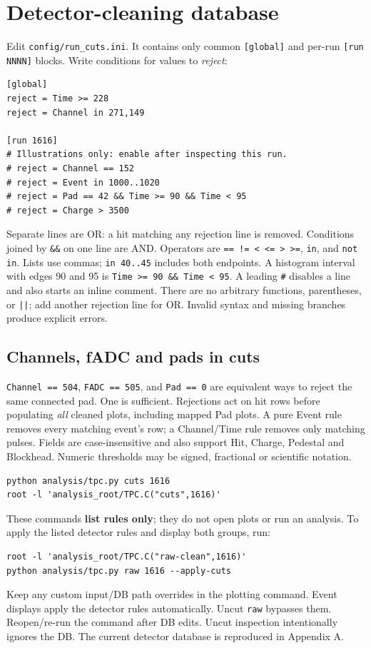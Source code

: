 \documentclass[11pt,a4paper]{article}
\begin{document}
\section{Detector-cleaning database}
Edit \texttt{config/run\_cuts.ini}. It contains only common \texttt{[global]} and
per-run \texttt{[run NNNN]} blocks. Write conditions for values to \emph{reject}:
\begin{lstlisting}
[global]
reject = Time >= 228
reject = Channel in 271,149

[run 1616]
# Illustrations only: enable after inspecting this run.
# reject = Channel == 152
# reject = Event in 1000..1020
# reject = Pad == 42 && Time >= 90 && Time < 95
# reject = Charge > 3500
\end{lstlisting}
Separate lines are OR: a hit matching any rejection line is removed. Conditions
joined by \texttt{\&\&} on one line are AND. Operators are
\texttt{== != < <= > >=}, \texttt{in}, and \texttt{not in}.
Lists use commas; \texttt{in 40..45} includes both endpoints. A histogram interval
with edges 90 and 95 is \texttt{Time >= 90 \&\& Time < 95}.
A leading \texttt{\#} disables a line and also starts an inline comment.
There are no arbitrary functions, parentheses, or \texttt{||}; add another rejection
line for OR. Invalid syntax and missing branches produce explicit errors.

\subsection{Channels, fADC and pads in cuts}
\texttt{Channel == 504}, \texttt{FADC == 505}, and \texttt{Pad == 0} are equivalent
ways to reject the same connected pad. One is sufficient. Rejections act on hit rows
before populating \emph{all} cleaned plots, including mapped Pad plots. A pure Event
rule removes every matching event's row; a Channel/Time rule removes only matching
pulses. Fields are case-insensitive and also support Hit, Charge, Pedestal and
Blockhead. Numeric thresholds may be signed, fractional or scientific notation.
\begin{lstlisting}
python analysis/tpc.py cuts 1616
root -l 'analysis_root/TPC.C("cuts",1616)'
\end{lstlisting}
These commands \textbf{list rules only}; they do not open plots or run an analysis.
To apply the listed detector rules and display both groups, run:
\begin{lstlisting}
root -l 'analysis_root/TPC.C("raw-clean",1616)'
python analysis/tpc.py raw 1616 --apply-cuts
\end{lstlisting}
Keep any custom input/DB path overrides in the plotting command. Event displays
apply the detector rules automatically. Uncut \texttt{raw} bypasses them.
Reopen/re-run the command after DB edits. Uncut inspection intentionally ignores the
DB. The current detector database is reproduced in Appendix A.
\end{document}
